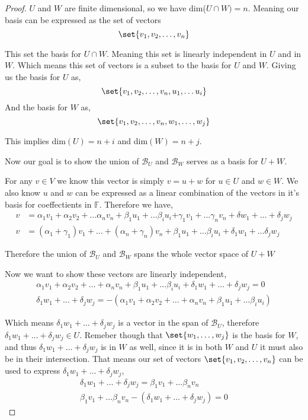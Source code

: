 \documentclass[12pt]{article}
\DeclarePairedDelimiter\set\{\}
\newcommand      {\Fm}         {{\mathbb F}}
\begin{document}
\begin{proof}
    $U$ and $W$ are finite dimensional, so we have dim($U\cap W) = n$. Meaning our basis can be expressed as the set of vectors
    \[\set{v_1, v_2,\dots, v_n}\]

    This set the basis for $U\cap W$. Meaning this set is linearly independent in $U$ and in $W$. Which means this set of vectors is a subset to the basis for $U$ and $W$. Giving us the basis for $U$ as,
    \[\set{v_1, v_2, \dots, v_n, u_1, \dots u_i}\]
    And the basis for $W$ as,
    \[\set{v_1,v_2,\dots, v_n, w_1,\dots, w_j}\]

    This implies dim$(U) = n + i$ and dim$(W) = n + j$. 

    Now our goal is to show the union of $\mathcal{B}_U$ and $\mathcal{B}_W$ serves as a basis for $U + W$. 

    For any $v\in V$ we know this vector is simply $v = u + w$ for $u\in U$ and $w\in W$. We also know $u$ and $w$ can be expressed as a linear combination of the vectors in it's basis for coeffectients in $\Fm$. Therefore we have,
    \begin{align*}
        v &= \alpha_1v_1 + \alpha_2v_2 + \dots \alpha_nv_n + \beta_1u_1 + \dots \beta_iu_i \textbf{+} \gamma_1v_1+\dots \gamma_nv_n + \delta w_1 + \dots +\delta_j w_j \\
        v &= (\alpha_1 + \gamma_1)v_1 + \dots + (\alpha_n + \gamma_n)v_n + \beta_1u_1 + \dots \beta_iu_i + \delta_1w_1 + \dots \delta_jw_j
    \end{align*}

    Therefore the union of $\mathcal{B}_U$ and $\mathcal{B}_W$ spans the whole vector space of $U+W$

    Now we want to show these vectors are linearly independent,
    \begin{align*}
        \alpha_1v_1+ \alpha_2v_2+ \dots+ \alpha_nv_n+ \beta_1u_1+ \dots\beta_i u_i +  \delta_1w_1+\dots+ \delta_jw_j = 0 \\
        \delta_1w_1+\dots+ \delta_jw_j = -(\alpha_1v_1 + \alpha_2v_2+ \dots+ \alpha_nv_n+ \beta_1u_1+ \dots\beta_i u_i)
    \end{align*}

    Which means $\delta_1w_1+\dots+ \delta_jw_j $ is a vector in the span of $\mathcal{B}_U$, therefore $\delta_1w_1+\dots+ \delta_jw_j \in U$. Remeber though that $\set{w_1,\dots,w_j}$ is the basis for $W$, and thus $\delta_1w_1+\dots+ \delta_jw_j $ is in $W$ as well, since it is in both $W$ and $U$ it must also be in their intersection. That means our set of vectors $\set{v_1, v_2,\dots, v_n}$ can be used to express $\delta_1w_1+\dots+ \delta_jw_j$,
    \begin{align*}
        \delta_1w_1+\dots+ \delta_jw_j = \beta_1v_1 + \dots \beta_nv_n \\
        \beta_1v_1 + \dots \beta_nv_n  - (\delta_1w_1+\dots+ \delta_jw_j ) = 0
    \end{align*}


\end{proof}
\end{document}
